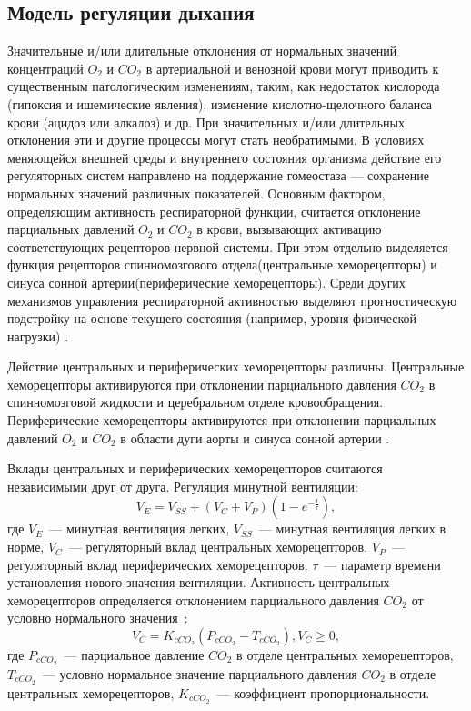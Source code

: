\subsection{Модель регуляции дыхания}
\label{sec:lung_reg}
Значительные и/или длительные отклонения от нормальных значений концентраций $O_{2}$ и $CO_{2}$ в артериальной и венозной крови могут приводить к существенным патологическим изменениям, таким, как недостаток кислорода (гипоксия и ишемические явления), изменение кислотно-щелочного баланса крови (ацидоз или алкалоз) и др. При значительных и/или длительных отклонения эти и другие процессы могут стать необратимыми.
В условиях меняющейся внешней среды и внутреннего состояния организма действие его регуляторных систем направлено на поддержание гомеостаза --- сохранение нормальных значений различных показателей. Основным фактором, определяющим активность респираторной функции, считается отклонение парциальных давлений $O_{2}$ и $CO_{2}$ в крови, вызывающих активацию соответствующих рецепторов нервной системы. При этом отдельно выделяется функция рецепторов спинномозгового отдела(центральные хеморецепторы) и синуса сонной артерии(периферические хеморецепторы).
Среди других механизмов управления респираторной активностью выделяют прогностическую подстройку на основе текущего состояния (например, уровня физической нагрузки) \cite{volkov2013}.

Действие центральных и периферических хеморецепторы различны.
Центральные хеморецепторы активируются при отклонении парциального давления $CO_{2}$ в спинномозговой жидкости и церебральном отделе кровообращения. Периферические хеморецепторы активируются при отклонении парциальных давлений $O_{2}$ и $CO_{2}$ в области дуги аорты и синуса сонной артерии \cite{wolf2007}.

Вклады центральных и периферических хеморецепторов считаются независимыми друг от друга. Регуляция минутной вентиляции: 
\begin{equation}\label{VentReg}
V_{E}=V_{SS}+\left(V_{C}+V_{P}\right)\left(1-e^{-\frac{t}{\tau}}\right),
\end{equation}
где \( V_{E}\)~--- минутная вентиляция легких, 
\( V_{SS}\)~--- минутная вентиляция легких в норме, 
\( V_{C}\)~--- регуляторный вклад центральных хеморецепторов,
\( V_{P}\)~--- регуляторный вклад периферических хеморецепторов,
\( \tau\)~--- параметр времени установления нового значения вентиляции. 
Активность центральных хеморецепторов определяется отклонением парциального давления  $CO_{2}$ от условно нормального значения~\cite{wolf2007}:
\begin{equation}
V_{C}=K_{cCO_{2}}\left(P_{cCO_{2}}-T_{cCO_{2}} \right), V_{C}\ge 0,
\end{equation}
\noindent где \( P_{cCO_{2}}\)~--- парциальное давление $CO_{2}$ в отделе центральных хеморецепторов, 
\( T_{cCO_{2}}\)~--- условно нормальное значение парциального давления $CO_{2}$ в отделе центральных хеморецепторов, 
\( K_{cCO_{2}}\)~--- коэффициент пропорциональности.

